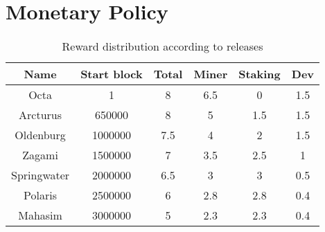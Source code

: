 \section{Monetary Policy}
\label{sec:mp}

\begin{table}[h!]
\centering
\begin{tabular}{||c c c c c c||}
 \hline
    Name & Start block & Total & Miner & Staking & Dev \\ [0.5ex]

    \hline\hline
    Octa & 1 & 8 & 6.5 & 0 & 1.5 \\
    Arcturus & 650000 & 8 & 5 & 1.5 & 1.5 \\
    Oldenburg & 1000000 & 7.5 & 4 & 2 & 1.5 \\
    Zagami & 1500000 & 7 & 3.5 & 2.5 & 1 \\
    Springwater & 2000000 & 6.5 & 3 & 3 & 0.5 \\
    Polaris & 2500000 & 6 & 2.8 & 2.8 & 0.4 \\
    Mahasim & 3000000 & 5 & 2.3 & 2.3 & 0.4 \\ [1ex]
    \hline

\end{tabular}
\caption{Reward distribution according to releases}
\label{table:1}
\end{table}
